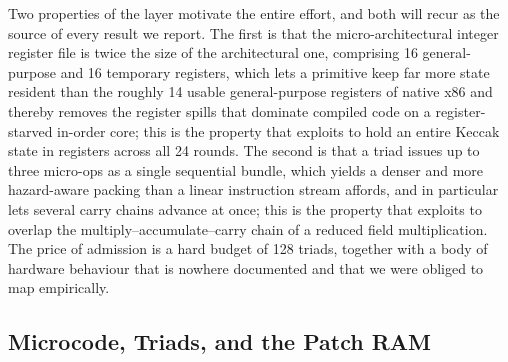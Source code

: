 Two properties of the layer motivate the entire effort, and both will recur as
the source of every result we report. The first is that the
micro-architectural integer register file is twice the size of the
architectural one, comprising 16 general-purpose and 16 temporary registers,
which lets a primitive keep far more state resident than the roughly 14 usable
general-purpose registers of native x86 and thereby removes the register spills
that dominate compiled code on a register-starved in-order core; this is the
property that  exploits to hold an entire Keccak state in
registers across all 24 rounds. The second is that a triad issues up to three
micro-ops as a single sequential bundle, which yields a denser and more
hazard-aware packing than a linear instruction stream affords, and in
particular lets several carry chains advance at once; this is the property that
 exploits to overlap the multiply--accumulate--carry chain
of a reduced field multiplication. The price of admission is a hard budget of
128 triads, together with a body of hardware behaviour that is nowhere
documented and that we were obliged to map empirically.

\subsection{Microcode, Triads, and the Patch RAM}
\label{sec:triad-anatomy}

